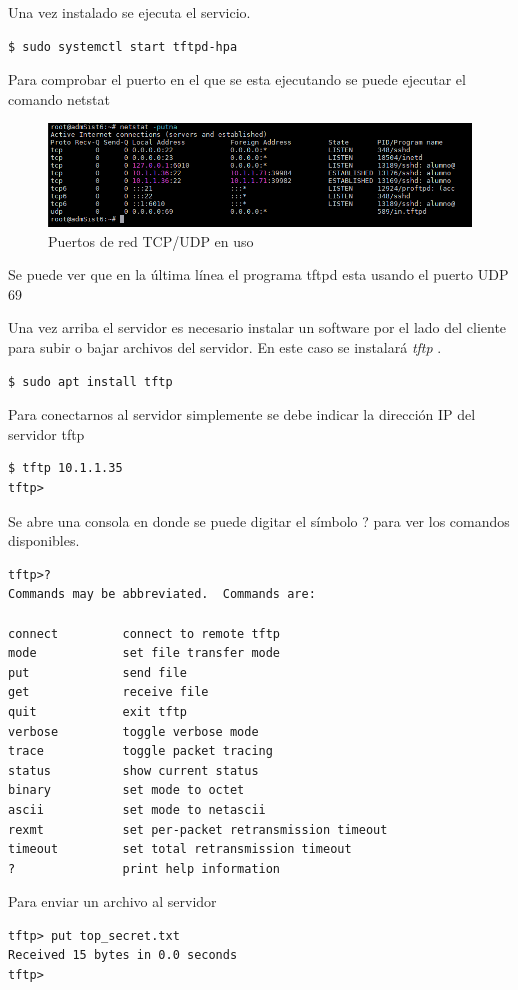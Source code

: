 \documentclass[12pt]{article}
\begin{document}
Una vez instalado se ejecuta el servicio.
\begin{lstlisting}[frame=single]
$ sudo systemctl start tftpd-hpa
\end{lstlisting}

Para comprobar el puerto en el que se esta ejecutando se puede ejecutar el comando netstat

\begin{figure}[!h]
   \centering
   \includegraphics[scale=.69]{imgs/netstat1.png}
   \caption{Puertos de red TCP/UDP en uso}
   \label{fig7}
\end{figure}
Se puede ver que en la última línea el programa tftpd esta usando el puerto UDP 69

Una vez arriba el servidor es necesario instalar un software por el lado del cliente para subir o bajar archivos del servidor. En este caso se instalará  \emph{tftp} .

\begin{lstlisting}[frame=single]
$ sudo apt install tftp
\end{lstlisting}

Para conectarnos al servidor simplemente se debe indicar la dirección IP del servidor tftp
\begin{lstlisting}[frame=single]
$ tftp 10.1.1.35
tftp>
\end{lstlisting}

Se abre una consola en donde se puede digitar el símbolo ? para ver los comandos disponibles.
\begin{lstlisting}[frame=single]
tftp>?
Commands may be abbreviated.  Commands are:

connect         connect to remote tftp
mode            set file transfer mode
put             send file
get             receive file
quit            exit tftp
verbose         toggle verbose mode
trace           toggle packet tracing
status          show current status
binary          set mode to octet
ascii           set mode to netascii
rexmt           set per-packet retransmission timeout
timeout         set total retransmission timeout
?               print help information

\end{lstlisting}
Para enviar un archivo al servidor
\begin{lstlisting}[frame=single]
tftp> put top_secret.txt
Received 15 bytes in 0.0 seconds
tftp>
\end{lstlisting}
\end{document}
